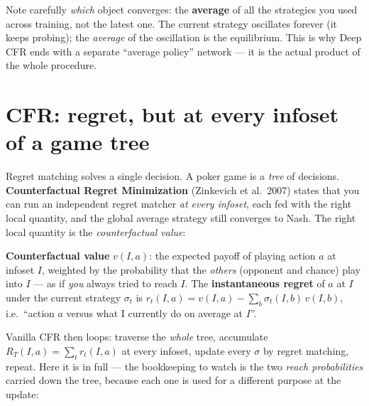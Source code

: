 \documentclass[11pt,a4paper]{article}
\begin{document}
\begin{intuition}
Note carefully \emph{which} object converges: the \textbf{average} of all the
strategies you used across training, not the latest one. The current strategy
oscillates forever (it keeps probing); the \emph{average} of the oscillation is
the equilibrium. This is why Deep CFR ends with a separate ``average policy''
network --- it is the actual product of the whole procedure.
\end{intuition}

\section{CFR: regret, but at every infoset of a game tree}

Regret matching solves a single decision. A poker game is a \emph{tree} of
decisions. \textbf{Counterfactual Regret Minimization} (Zinkevich et al.\ 2007)
states that you can run an independent regret matcher \emph{at every infoset},
each fed with the right local quantity, and the global average strategy still
converges to Nash. The right local quantity is the \emph{counterfactual value}:

\begin{defbox}
\textbf{Counterfactual value} $v(I,a)$: the expected payoff of playing action
$a$ at infoset $I$, weighted by the probability that the \emph{others} (opponent
and chance) play into $I$ --- as if \emph{you} always tried to reach $I$.
The \textbf{instantaneous regret} of $a$ at $I$ under the current strategy
$\sigma_t$ is
$r_t(I,a) = v(I,a) - \sum_{b}\sigma_t(I,b)\,v(I,b)$,
i.e.\ ``action $a$ versus what I currently do on average at $I$''.
\end{defbox}

Vanilla CFR then loops: traverse the \emph{whole} tree, accumulate
$R_T(I,a)=\sum_t r_t(I,a)$ at every infoset, update every $\sigma$ by regret
matching, repeat. Here it is in full --- the bookkeeping to watch is the two
\emph{reach probabilities} carried down the tree, because each one is used for
a different purpose at the update:
\end{document}
